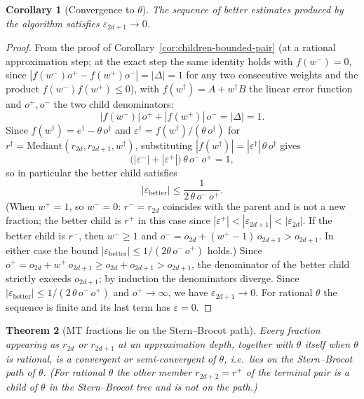 \documentclass[12pt]{article}
\newtheorem{theorem}{Theorem}[section]
\newtheorem{corollary}[theorem]{Corollary}
\theoremstyle{definition}
\theoremstyle{remark}
\theoremstyle{plain}
\newcommand{\eps}{\varepsilon}
\newcommand{\Dval}{\Delta}
\newcommand{\wplus}{w^{+}}
\newcommand{\wminus}{w^{-}}
\newcommand{\rplus}{r^{+}}
\newcommand{\odenp}{o^{+}}
\newcommand{\odenm}{o^{-}}
\newcommand{\epsplus}{\eps^{+}}
\newcommand{\epsminus}{\eps^{-}}
\begin{document}
\begin{corollary}[Convergence to $\theta$]
\label{cor:convergence}
The sequence of better estimates produced by the algorithm satisfies $\eps_{2d+1} \to 0$.
\end{corollary}

\begin{proof}
From the proof of Corollary~\ref{cor:children-bounded-pair} (at a rational approximation step; at the
exact step the same identity holds with $f(\wminus) = 0$, since
$|f(\wminus)\odenp - f(\wplus)\odenm| = |\Dval| = 1$ for any two consecutive weights
and the product $f(\wminus)f(\wplus) \leq 0$), with $f(w^\dagger) = A + w^\dagger B$
the linear error function and $\odenp, \odenm$ the two child denominators:
\[
  |f(\wminus)|\,\odenp + |f(\wplus)|\,\odenm = |\Dval| = 1.
\]
Since $f(w^\dagger) = e^\dagger - \theta\,o^\dagger$ and $\eps^\dagger = f(w^\dagger)/(\theta\,o^\dagger)$
for $r^\dagger = \mathrm{Mediant}(r_{2d}, r_{2d+1}, w^\dagger)$, substituting
$|f(w^\dagger)| = |\eps^\dagger|\,\theta\,o^\dagger$ gives
\[
  \bigl(|\epsminus| + |\epsplus|\bigr)\,\theta\,\odenm\,\odenp = 1,
\]
so in particular the better child satisfies
\[
  |\eps_{\mathrm{better}}| \leq \frac{1}{2\,\theta\,\odenm\,\odenp}.
\]
(When $w^+ = 1$, so $\wminus = 0$: $r^- = r_{2d}$ coincides with the parent and is
not a new fraction; the better child is $r^+$ in this case since
$|\epsplus| < |\eps_{2d+1}| < |\eps_{2d}|$.
If the better child is $r^-$, then $w^- \geq 1$ and $o^- = o_{2d} + (w^+-1)\,o_{2d+1} > o_{2d+1}$.
In either case the bound $|\eps_\mathrm{better}| \leq 1/(2\theta\,\odenm\,\odenp)$ holds.)
Since $\odenp = o_{2d} + \wplus\,o_{2d+1} \geq o_{2d} + o_{2d+1} > o_{2d+1}$, the
denominator of the better child strictly exceeds $o_{2d+1}$; by induction the
denominators diverge.
Since $|\eps_{\mathrm{better}}| \leq 1/(2\,\theta\,\odenm\,\odenp)$ and
$\odenp \to \infty$, we have $\eps_{2d+1} \to 0$.
For rational $\theta$ the sequence is finite and its last term has $\eps = 0$.
\end{proof}
\begin{theorem}[MT fractions lie on the Stern--Brocot path]
\label{thm:sb-path}
Every fraction appearing as $r_{2d}$ or $r_{2d+1}$ at an approximation depth, together with
$\theta$ itself when $\theta$ is rational, is a convergent or semi-convergent of
$\theta$, i.e.\ lies on the Stern--Brocot path of $\theta$.
(For rational $\theta$ the other member $r_{2d+2} = \rplus$ of the terminal pair is a
child of $\theta$ in the Stern--Brocot tree and is not on the path.)
\end{theorem}
\end{document}
